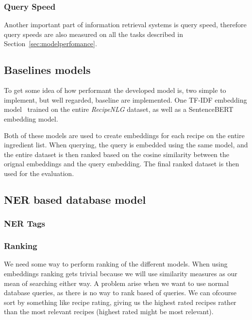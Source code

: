 \documentclass[11pt]{article}
\begin{document}
\subsubsection{Query Speed}
Another important part of information retrieval systems is query speed,
therefore query speeds are also measured on all the tasks described in
Section~\ref{sec:modelperfomance}.

\subsection{Baselines models}
To get some idea of how performant the developed model is, two simple to
implement, but well regarded, baseline are implemented.
One TF-IDF embedding model~\cite{tfidf} trained on the entire \emph{RecipeNLG}
dataset, as well as a SentenceBERT~\cite{sentence-bert} embedding model.

Both of these models are used to create embeddings for each recipe on the entire
ingredient list.
When querying, the query is embedded using the same model, and the entire
dataset is then ranked based on the cosine similarity between the orignal
embeddings and the query embedding.
The final ranked dataset is then used for the evaluation.

\subsection{NER based database model}
\subsubsection{NER Tags}\label{sec:ner_tags}
\subsubsection{Ranking}



\iffalse{}
We need some way to perform ranking of the different models.
When using embeddings ranking gets trivial because we will use similarity
measures as our mean of searching either way.
A problem arise when we want to use normal database queries, as there is no way
to rank based of queries.
We can ofcourse sort by something like recipe rating, giving us the highest
rated recipes rather than the most relevant recipes (highest rated might be most
relevant).
\end{document}
